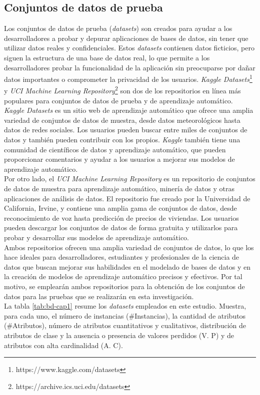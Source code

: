 \subsection{Conjuntos de datos de prueba}
Los conjuntos de datos de prueba (\textit{datasets}) son creados para ayudar a los desarrolladores a probar y depurar aplicaciones de bases de datos, sin tener que utilizar datos reales y confidenciales. Estos \textit{datasets} contienen datos ficticios, pero siguen la estructura de una base de datos real, lo que permite a los desarrolladores probar la funcionalidad de la aplicación sin preocuparse por dañar datos importantes o comprometer la privacidad de los usuarios. \textit{Kaggle Datasets}\footnote{https://www.kaggle.com/datasets} y \textit{UCI Machine Learning Repository}\footnote{https://archive.ics.uci.edu/datasets} son dos de los repositorios en línea más populares para conjuntos de datos de prueba y de aprendizaje automático. \\
\textit{Kaggle Datasets} es un sitio web de aprendizaje automático que ofrece una amplia variedad de conjuntos de datos de muestra, desde datos meteorológicos hasta datos de redes sociales. Los usuarios pueden buscar entre miles de conjuntos de datos y también pueden contribuir con los propios. \textit{Kaggle} también tiene una comunidad de científicos de datos y aprendizaje automático, que pueden proporcionar comentarios y ayudar a los usuarios a mejorar sus modelos de aprendizaje automático. \\
Por otro lado, el \textit{UCI Machine Learning Repository} es un repositorio de conjuntos de datos de muestra para aprendizaje automático, minería de datos y otras aplicaciones de análisis de datos. El repositorio fue creado por la Universidad de California, Irvine, y contiene una amplia gama de conjuntos de datos, desde reconocimiento de voz hasta predicción de precios de viviendas. Los usuarios pueden descargar los conjuntos de datos de forma gratuita y utilizarlos para probar y desarrollar sus modelos de aprendizaje automático. \\
Ambos repositorios ofrecen una amplia variedad de conjuntos de datos, lo que los hace ideales para desarrolladores, estudiantes y profesionales de la ciencia de datos que buscan mejorar sus habilidades en el modelado de bases de datos y en la creación de modelos de aprendizaje automático precisos y efectivos. Por tal motivo, se emplearán ambos repositorios para la obtención de los conjuntos de datos para las pruebas que se realizarán en esta investigación. \\
La tabla \ref{tab:bd-cap1} resume los \textit{datasets} empleados en este estudio. Muestra, para cada uno, el número de instancias (\#Instancias), la cantidad de atributos (\#Atributos), número de atributos cuantitativos y cualitativos, distribución de atributos de clase y la ausencia o presencia de valores perdidos (V. P) y de atributos con alta cardinalidad (A. C).

